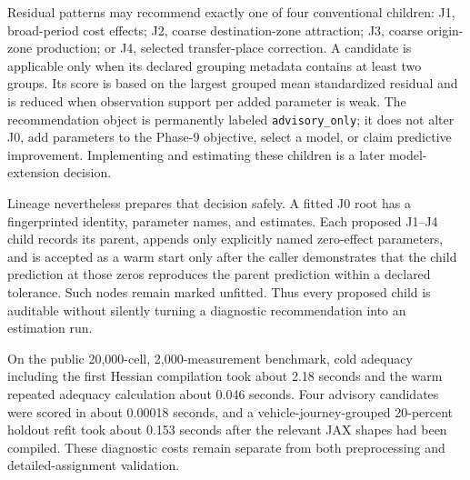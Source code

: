 Residual patterns may recommend exactly one of four conventional children:
J1, broad-period cost effects; J2, coarse destination-zone attraction; J3,
coarse origin-zone production; or J4, selected transfer-place correction.  A
candidate is applicable only when its declared grouping metadata contains at
least two groups.  Its score is based on the largest grouped mean standardized
residual and is reduced when observation support per added parameter is weak.
The recommendation object is permanently labeled \texttt{advisory\_only}; it
does not alter J0, add parameters to the Phase-9 objective, select a model, or
claim predictive improvement.  Implementing and estimating these children is
a later model-extension decision.

Lineage nevertheless prepares that decision safely.  A fitted J0 root has a
fingerprinted identity, parameter names, and estimates.  Each proposed J1--J4
child records its parent, appends only explicitly named zero-effect parameters,
and is accepted as a warm start only after the caller demonstrates that the
child prediction at those zeros reproduces the parent prediction within a
declared tolerance.  Such nodes remain marked unfitted.  Thus every proposed
child is auditable without silently turning a diagnostic recommendation into an
estimation run.

On the public 20,000-cell, 2,000-measurement benchmark, cold adequacy including
the first Hessian compilation took about 2.18 seconds and the warm repeated
adequacy calculation about 0.046 seconds.  Four advisory candidates were scored
in about 0.00018 seconds, and a vehicle-journey-grouped 20-percent holdout refit
took about 0.153 seconds after the relevant JAX shapes had been compiled.  These
diagnostic costs remain separate from both preprocessing and detailed-assignment
validation.


